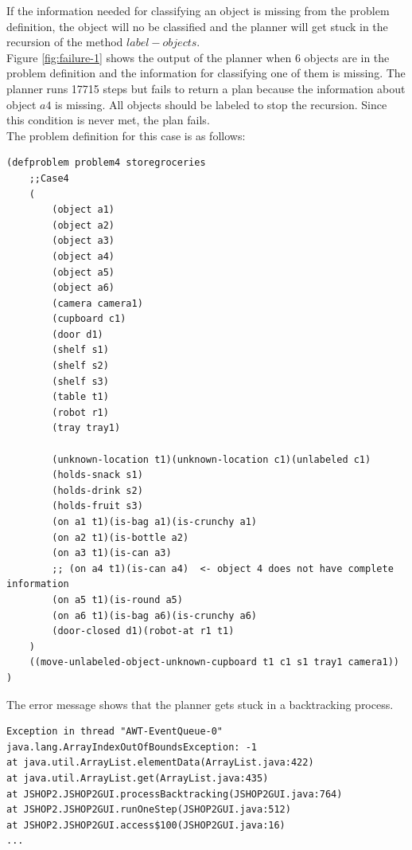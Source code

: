\documentclass[paper=a4, fontsize=11pt]{scrartcl}
\begin{document}
	\vspace{5mm}

	If the information needed for classifying an object is missing from the problem definition, the object will no be classified and the planner will get stuck in the recursion of the method $label-objects$. \\

	Figure \ref{fig:failure-1} shows the output of the planner when 6 objects are in the problem definition and the information for classifying one of them is missing. The planner runs 17715 steps but fails to return a plan because the information about object $a4$ is missing. All objects should be labeled to stop the recursion. Since this condition is never met, the plan fails. \\

	The problem definition for this case is as follows: \\

	\begin{lstlisting}
(defproblem problem4 storegroceries
	;;Case4
	(
		(object a1)
		(object a2)
		(object a3)
		(object a4)
		(object a5)
		(object a6)
		(camera camera1)
		(cupboard c1)
		(door d1)
		(shelf s1)
		(shelf s2)
		(shelf s3)
		(table t1)
		(robot r1)
		(tray tray1)

		(unknown-location t1)(unknown-location c1)(unlabeled c1)
		(holds-snack s1)
		(holds-drink s2)
		(holds-fruit s3)
		(on a1 t1)(is-bag a1)(is-crunchy a1)
		(on a2 t1)(is-bottle a2)
		(on a3 t1)(is-can a3)
		;; (on a4 t1)(is-can a4)  <- object 4 does not have complete information
		(on a5 t1)(is-round a5)
		(on a6 t1)(is-bag a6)(is-crunchy a6)
		(door-closed d1)(robot-at r1 t1)
	)
	((move-unlabeled-object-unknown-cupboard t1 c1 s1 tray1 camera1))
)
	\end{lstlisting}

	\vspace{5mm}


	The error message shows that the planner gets stuck in a backtracking process. \\

	\begin{lstlisting}
Exception in thread "AWT-EventQueue-0" java.lang.ArrayIndexOutOfBoundsException: -1
at java.util.ArrayList.elementData(ArrayList.java:422)
at java.util.ArrayList.get(ArrayList.java:435)
at JSHOP2.JSHOP2GUI.processBacktracking(JSHOP2GUI.java:764)
at JSHOP2.JSHOP2GUI.runOneStep(JSHOP2GUI.java:512)
at JSHOP2.JSHOP2GUI.access$100(JSHOP2GUI.java:16)
...
	\end{lstlisting}
\end{document}
